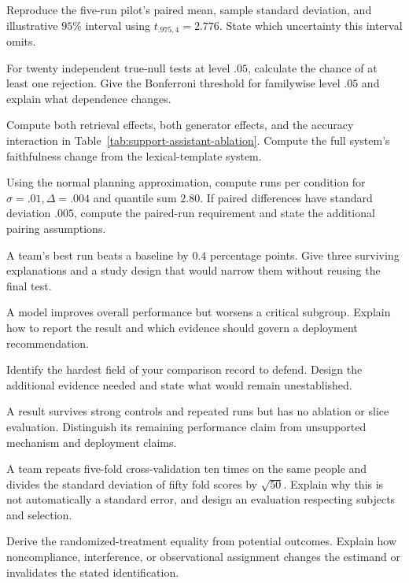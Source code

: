 \begin{exercises}
\item {}Reproduce the five-run pilot's paired mean, sample standard deviation, and illustrative $95\%$ interval using $t_{.975,4}=2.776$. State which uncertainty this interval omits.
\item {}For twenty independent true-null tests at level $.05$, calculate the chance of at least one rejection. Give the Bonferroni threshold for familywise level $.05$ and explain what dependence changes.
\item {}Compute both retrieval effects, both generator effects, and the accuracy interaction in Table~\ref{tab:support-assistant-ablation}. Compute the full system's faithfulness change from the lexical-template system.
\item {}Using the normal planning approximation, compute runs per condition for $\sigma=.01,\Delta=.004$ and quantile sum $2.80$. If paired differences have standard deviation $.005$, compute the paired-run requirement and state the additional pairing assumptions.
\end{exercises}

\clearpage
\begin{challengeexercises}
\item {}A team's best run beats a baseline by $0.4$ percentage points. Give three surviving explanations and a study design that would narrow them without reusing the final test.
\item {}A model improves overall performance but worsens a critical subgroup. Explain how to report the result and which evidence should govern a deployment recommendation.
\item {}Identify the hardest field of your comparison record to defend. Design the additional evidence needed and state what would remain unestablished.
\item {}A result survives strong controls and repeated runs but has no ablation or slice evaluation. Distinguish its remaining performance claim from unsupported mechanism and deployment claims.
\item {}A team repeats five-fold cross-validation ten times on the same people and divides the standard deviation of fifty fold scores by $\sqrt{50}$. Explain why this is not automatically a standard error, and design an evaluation respecting subjects and selection.
\item {}Derive the randomized-treatment equality from potential outcomes. Explain how noncompliance, interference, or observational assignment changes the estimand or invalidates the stated identification.
\end{challengeexercises}

\clearpage
\begingroup\pagestyle{empty}\cleardoublepage\endgroup
\endgroup
